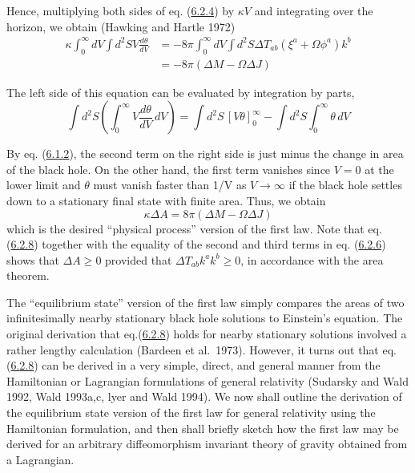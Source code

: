 \documentclass[11pt,a4paper]{article}
\begin{document}
Hence, multiplying both sides of eq. (\hyperref[eq:6.2.4]{6.2.4}) by \(\kappa V\) and integrating over the horizon, we obtain (Hawking and Hartle 1972)
\begin{equation*}
\begin{aligned}
\kappa \int_0^\infty dV \int d^2S V \frac{d\theta}{dV} &= -8\pi \int_0^\infty dV \int d^2S \Delta T_{ab}(\xi^a + \Omega \phi^a) k^b\\
&= -8\pi (\Delta M - \Omega \Delta J)
\end{aligned} \tag{6.2.6}\label{eq:6.2.6}
\end{equation*}

The left side of this equation can be evaluated by integration by parts,
\begin{equation*}
\int d^2S\left(\int_0^\infty V\frac{d\theta}{dV}\,dV\right)=\int d^2S\,[V\theta]_0^\infty-\int d^2S\int_0^\infty\theta\,dV \tag{6.2.7}\label{eq:6.2.7}
\end{equation*}

By eq. (\hyperref[eq:6.1.2]{6.1.2}), the second term on the right side is just minus the change in area of the black hole. On the other hand, the first term vanishes since \(V=0\) at the lower limit and \(\theta\) must vanish faster than 1/V as \(V\to\infty\) if the black hole settles down to a stationary final state with finite area. Thus, we obtain
\begin{equation*}
\kappa \Delta A = 8\pi (\Delta M - \Omega \Delta J) \tag{6.2.8}\label{eq:6.2.8}
\end{equation*}
which is the desired ``physical process'' version of the first law. Note that eq. (\hyperref[eq:6.2.8]{6.2.8}) together with the equality of the second and \hypertarget{source-156}{} third terms in eq. (\hyperref[eq:6.2.6]{6.2.6}) shows that \(\Delta A \ge 0\) provided that \(\Delta T_{ab} k^a k^b \ge 0\), in accordance with the area theorem.

The ``equilibrium state'' version of the first law simply compares the areas of two infinitesimally nearby stationary black hole solutions to Einstein's equation. The original derivation that eq.(\hyperref[eq:6.2.8]{6.2.8}) holds for nearby stationary solutions involved a rather lengthy calculation (Bardeen et al.~1973). However, it turns out that eq. (\hyperref[eq:6.2.8]{6.2.8}) can be derived in a very simple, direct, and general manner from the Hamiltonian or Lagrangian formulations of general relativity (Sudarsky and Wald 1992, Wald 1993a,c, lyer and Wald 1994). We now shall outline the derivation of the equilibrium state version of the first law for general relativity using the Hamiltonian formulation, and then shall briefly sketch how the first law may be derived for an arbitrary diffeomorphism invariant theory of gravity obtained from a Lagrangian.
\end{document}
